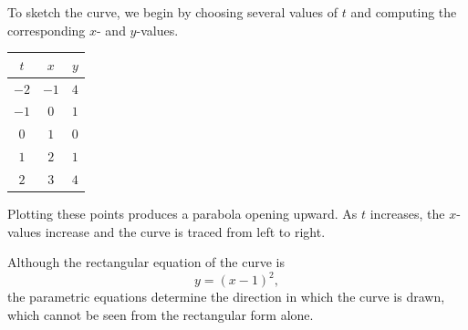 \begin{Answer}[ref = parametric2]

    To sketch the curve, we begin by choosing several values of $t$ and computing
    the corresponding $x$- and $y$-values.

    \begin{center}
        \begin{tabular}{c|c|c}
            $t$  & $x $ & $y$ \\
            \hline
            $-2$ & $-1$ & $4$ \\
            $-1$ & $0$  & $1$ \\
            $0$  & $1$  & $0$ \\
            $1$  & $2$  & $1$ \\
            $2$  & $3$  & $4$
        \end{tabular}
    \end{center}

    Plotting these points produces a parabola opening upward. As $t$ increases,
    the $x$-values increase and the curve is traced from left to right.

    Although the rectangular equation of the curve is
    \[
        y = (x - 1)^2,
    \]
    the parametric equations determine the direction in which the curve is drawn,
    which cannot be seen from the rectangular form alone.

\end{Answer}


%
%
%
%
%

